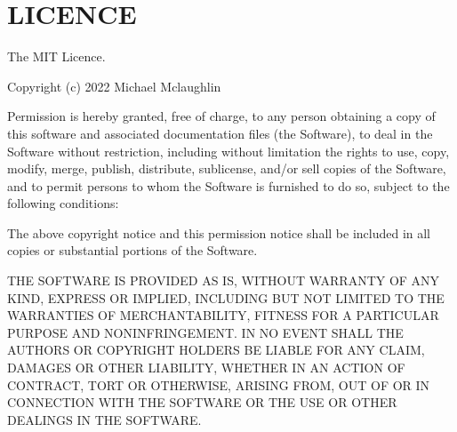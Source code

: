 \chapter{LICENCE}
\hypertarget{md_pkiclassroomrescheduler_2src_2main_2frontend_2node__modules_2decimal_8js_2_l_i_c_e_n_c_e}{}\label{md_pkiclassroomrescheduler_2src_2main_2frontend_2node__modules_2decimal_8js_2_l_i_c_e_n_c_e}
The MIT Licence.

Copyright (c) 2022 Michael Mclaughlin

Permission is hereby granted, free of charge, to any person obtaining a copy of this software and associated documentation files (the \textquotesingle{}Software\textquotesingle{}), to deal in the Software without restriction, including without limitation the rights to use, copy, modify, merge, publish, distribute, sublicense, and/or sell copies of the Software, and to permit persons to whom the Software is furnished to do so, subject to the following conditions\+:

The above copyright notice and this permission notice shall be included in all copies or substantial portions of the Software.

THE SOFTWARE IS PROVIDED \textquotesingle{}AS IS\textquotesingle{}, WITHOUT WARRANTY OF ANY KIND, EXPRESS OR IMPLIED, INCLUDING BUT NOT LIMITED TO THE WARRANTIES OF MERCHANTABILITY, FITNESS FOR A PARTICULAR PURPOSE AND NONINFRINGEMENT. IN NO EVENT SHALL THE AUTHORS OR COPYRIGHT HOLDERS BE LIABLE FOR ANY CLAIM, DAMAGES OR OTHER LIABILITY, WHETHER IN AN ACTION OF CONTRACT, TORT OR OTHERWISE, ARISING FROM, OUT OF OR IN CONNECTION WITH THE SOFTWARE OR THE USE OR OTHER DEALINGS IN THE SOFTWARE. 